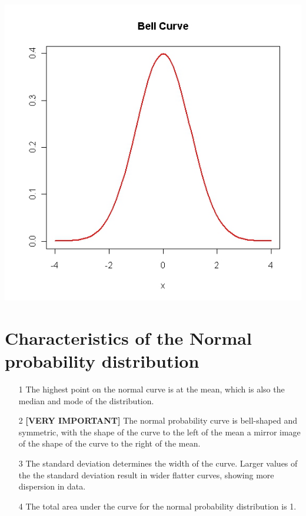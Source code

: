 \documentclass[]{report}
\begin{document}
	
	\begin{center}
		\includegraphics[scale=0.30]{images/5ABellCurve}
	\end{center}
	
\section{Characteristics of the Normal probability distribution}


	\begin{itemize}
		\item[1] The highest point on the normal curve is at the mean, which is also the median and mode of the distribution.
		\item[2] \textbf{[VERY IMPORTANT]}
		The normal probability curve is bell-shaped and symmetric, with the shape of the curve to the left of the mean a mirror image of the shape of the curve to the right of the mean.
		\item[3] The standard deviation determines the width of the curve. Larger values of the the standard deviation result in wider flatter curves, showing more dispersion in data.
		\item[4] The total area under the curve for the normal probability distribution is 1.
	\end{itemize}
	
\end{document}

